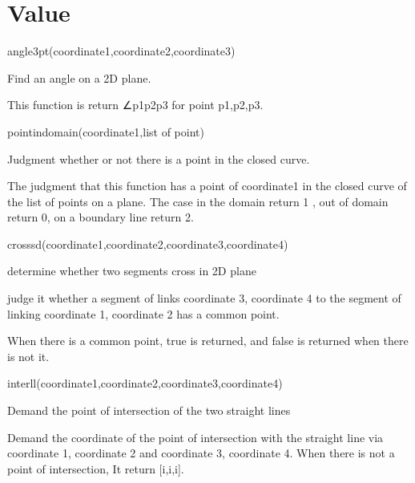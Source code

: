 \documentclass[papersize,a4paper,12pt]{article}
\begin{document}
\section{Value}
\begin{description}

\hypertarget{angle3pt}{}
\item[Function] angle3pt(coordinate1,coordinate2,coordinate3)
\item[Description] Find an angle on a 2D plane.
\item[Return value] This function is return ∠p1p2p3 for point p1,p2,p3.

\vspace{\baselineskip}

\hypertarget{pointindomain}{}
\item[Function] pointindomain(coordinate1,list of point)
\item[Description] Judgment whether or not there is a point in the closed curve.
\item[Return value] The judgment that this function has a point of coordinate1 in the closed curve of the list of points on a plane.  The case in the domain return 1 ,  out of domain return 0,  on a boundary line return 2.

\vspace{\baselineskip}

\hypertarget{crosssd}{}
\item[Function] crosssd(coordinate1,coordinate2,coordinate3,coordinate4)
\item[Description] determine whether two segments cross in 2D plane 
\item[Description]  judge it whether a segment of links coordinate 3, coordinate 4 to the segment of linking coordinate 1, coordinate 2 has a common point.
\item[Return value] When there is a common point, true is returned, and false is returned when there is not it.

\vspace{\baselineskip}

\hypertarget{interll}{}
\item[Function] interll(coordinate1,coordinate2,coordinate3,coordinate4)
\item[Description] Demand the point of intersection of the two straight lines
\item[Return value]  Demand the coordinate of the point of intersection with the straight line via coordinate 1, coordinate 2 and coordinate 3, coordinate 4.  When there is not a point of intersection, It return [i,i,i].


\end{description}
\end{document}
